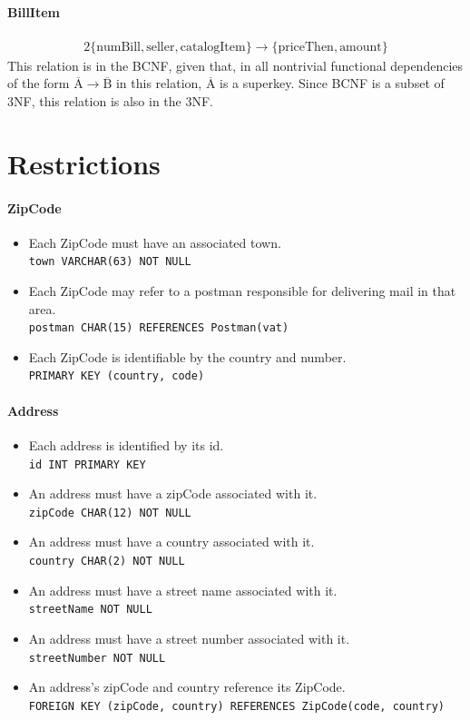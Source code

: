 \documentclass{report}[a4paper]
\theoremstyle{remark}
\begin{document}
\subsubsection{BillItem}
\begin{alignat*}{2}
\{\text{numBill},\text{seller},\text{catalogItem}\} \rightarrow \{\text{priceThen},\text{amount}\}
\end{alignat*}
This relation is in the BCNF, given that, in all nontrivial functional dependencies of the form $\overline{\text{A}} \rightarrow \overline{\text{B}}$ in this relation, $\overline{\text{A}}$ is a superkey. Since BCNF is a subset of 3NF, this relation is also in the 3NF.

\chapter{Restrictions}
\subsubsection{ZipCode}
\begin{itemize}
    \item Each ZipCode must have an associated town.                \\ \texttt{town VARCHAR(63) NOT NULL}
    \item Each ZipCode may refer to a postman responsible for delivering mail in that area. \\ \texttt{postman CHAR(15) REFERENCES Postman(vat)}
    \item Each ZipCode is identifiable by the country and number.   \\ \texttt{PRIMARY KEY (country, code)}
\end{itemize}
\subsubsection{Address}
\begin{itemize}
    \item Each address is identified by its id.                     \\ \texttt{id INT PRIMARY KEY}
    \item An address must have a zipCode associated with it.        \\ \texttt{zipCode CHAR(12) NOT NULL}
    \item An address must have a country associated with it.        \\ \texttt{country CHAR(2) NOT NULL}
    \item An address must have a street name associated with it.    \\ \texttt{streetName NOT NULL}
    \item An address must have a street number associated with it.  \\ \texttt{streetNumber NOT NULL}
    \item An address's zipCode and country reference its ZipCode.   \\ \texttt{FOREIGN KEY (zipCode, country) REFERENCES ZipCode(code, country)}
\end{itemize}
\end{document}
